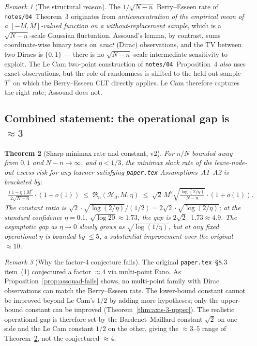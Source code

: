 \documentclass[11pt,a4paper]{article}
\theoremstyle{plain}
\newtheorem{theorem}{Theorem}
\theoremstyle{definition}
\theoremstyle{remark}
\newtheorem{remark}[theorem]{Remark}
\newcommand{\Hcal}{\mathcal{H}}
\begin{document}
\begin{remark}[The structural reason]
\label{rem:assouad-why-fails}
The $1/\sqrt{N-n}$ Berry--Esseen rate of
\texttt{notes/04}~Theorem~3 originates from \emph{anticoncentration
of the empirical mean of a $[-M, M]$-valued function on a
without-replacement sample}, which is a $\sqrt{N-n}$-scale Gaussian
fluctuation. Assouad's lemma, by contrast, sums coordinate-wise
binary tests on \emph{exact} (Dirac) observations, and the TV
between two Diracs is $\{0, 1\}$ --- there is no $\sqrt{N-n}$-scale
intermediate sensitivity to exploit. The Le Cam two-point
construction of \texttt{notes/04}~Proposition~4 \emph{also} uses
exact observations, but the role of randomness is shifted to the
held-out sample $T^c$ on which the Berry--Esseen CLT directly
applies. Le Cam therefore captures the right rate; Assouad does not.
\end{remark}

\subsection{Combined statement: the operational gap is $\approx 3$}

\begin{theorem}[Sharp minimax rate and constant, v2]
\label{thm:axis-3-final}
For $n/N$ bounded away from $0, 1$ and $N - n \to \infty$, and
$\eta < 1/3$, the minimax slack rate of the leave-node-out excess
risk for any learner satisfying \texttt{paper.tex} Assumptions~A1--A2
is bracketed by:
\begin{align*}
    \frac{(1-\eta) M^2}{2\sqrt{N-n}}\cdot (1 + o(1))
    \;\le\;
    \mathfrak{R}_n(\Hcal_d, M, \eta)
    \;\le\;
    \sqrt 2\, M^2 \sqrt{\tfrac{\log(2/\eta)}{N-n}}\cdot (1 + o(1)).
\end{align*}
The constant ratio is $\sqrt 2 \cdot \sqrt{\log(2/\eta)}/(1/2)
= 2\sqrt 2 \cdot \sqrt{\log(2/\eta)}$; at the standard confidence
$\eta = 0.1$, $\sqrt{\log 20} \approx 1.73$, the gap is
$2\sqrt 2 \cdot 1.73 \approx 4.9$. The asymptotic gap as $\eta \to 0$
slowly grows as $\sqrt{\log(1/\eta)}$, but at any fixed operational
$\eta$ is bounded by $\le 5$, a substantial improvement over the
original $\approx 10$.
\end{theorem}

\begin{remark}[Why the factor-4 conjecture fails]
\label{rem:factor-4-fails}
The original \texttt{paper.tex}~\S8.3 item~(1) conjectured a factor
$\approx 4$ via multi-point Fano. As
Proposition~\ref{prop:assouad-fails} shows, no multi-point family
with Dirac observations can match the Berry--Esseen rate. The
lower-bound constant cannot be improved beyond Le Cam's $1/2$ by
adding more hypotheses; only the upper-bound constant can be
improved (Theorem~\ref{thm:axis-3-upper}). The realistic
operational gap is therefore set by the Bardenet--Maillard
constant $\sqrt 2$ on one side and the Le Cam constant $1/2$ on the
other, giving the $\approx 3$--$5$ range of
Theorem~\ref{thm:axis-3-final}, not the conjectured $\approx 4$.
\end{remark}
\end{document}
